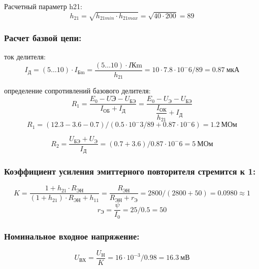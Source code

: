 Расчетный параметр h21:
\begin{equation}
   \label{eq:equation6_15}
h_{21}=\sqrt{h_{21min} \cdot h_{21max}}=\sqrt{40 \cdot 200}=89
\end{equation} 

 \subsubsection{Расчет базвой цепи:}
ток делителя:
 \begin{equation}
   \label{eq:equation6_16}
 I_{\text{Д}}=(5 \ldots 10) \cdot I_{\text{Бm}}=\dfrac{(5 \ldots 10) \cdot I{\text{Кm}}}{h_21}=10 \cdot 7.8\cdot 10^-6 /89=0.87~\text{мкА}
 \end{equation}

 определение сопротивлений базового делителя:
 \begin{equation}
   \label{eq:equation6_17}
   R_1=\dfrac{E_0-U{\text{Э}}-U_{\text{БЭ}}}{I_{\text{ОБ}}+I_{\text{Д}}}=\dfrac{E_0-U_{\text{Э}}-U_{\text{БЭ}}}{ \dfrac{I_{\text{ОК}}}{ h_{21}}+I_{\text{Д}} }
   \end{equation}
   \begin{equation*}
   R_1=(12.3-3.6-0.7)/(0.5 \cdot 10^-3/89+0.87 \cdot 10^-6)=1.2~\text{МОм}
   \end{equation*}

 \begin{equation}
   \label{eq:equation6_18}
   R_2=\dfrac{U_{\text{БЭ}}+U_{\text{Э}}}{I_{\text{Д}}}=(0.7+3.6)/0.87 \cdot 10^-6=5~\text{МОм}
 \end{equation}
\subsubsection{Коэффициент усиления эмиттерного повторителя стремится к 1:}
\begin{equation}
   \label{eq:equation6_19}
K=\dfrac{1+h_21 \cdot R_{\text{ЭН}}}{(1+h_21)\cdot R_{\text{ЭН}}+h_11}=\dfrac{R_{\text{ЭН}}}{R_{\text{ЭН}}+{r_{\text{Э}}}}=2800/(2800+50)=0.0980 \approx 1
\end{equation}
\begin{equation}
   \label{eq:equation6_20}
   r_{\text{Э}}=\dfrac{\psi}{I_0}=25/0.5=50
\end{equation}
\subsubsection{Номинальное входное напряжение:}
\begin{equation}
   \label{eq:equation6_21}
U_{\text{ВХ}}=\dfrac {U_{\text{Н}}}{K}=16 \cdot 10^{-3} /0.98= 16.3~\text {мВ}
\end{equation}
